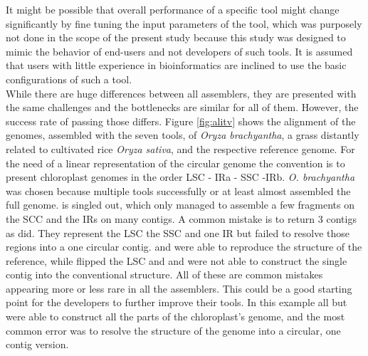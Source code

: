 It might be possible that overall performance of a specific tool might change
significantly by fine tuning the input parameters of the tool, which was purposely not
done in the scope of the present study because this study was designed to mimic the
behavior of end-users and not developers of such tools. It is assumed that
users with little experience in bioinformatics are inclined to use the basic configurations of such a tool. \\

While there are huge differences between all assemblers, they are presented with the same
challenges and the bottlenecks are similar for all of them. However, the success rate of
passing those differs. Figure \ref{fig:alitv} shows the alignment of the genomes,
assembled with the seven tools, of \textit{Oryza brachyantha}, a grass distantly related to
cultivated rice \textit{Oryza sativa}, and the respective reference genome. For the need
of a linear representation of the circular genome the convention is to present chloroplast
genomes in the order LSC - IRa - SSC -IRb. \textit{O. brachyantha} was chosen because
multiple tools successfully or at least almost assembled the full genome.  \cassp
\hspace{.5ex} is singled out, which only managed to assemble a few fragments on the SCC
and the IRs on many contigs. A common mistake is to return 3 contigs as \ioga
\hspace{.5ex} did. They represent the LSC the SSC and one IR but failed to resolve those
regions into a one circular contig. \go \hspace{.5ex} and \fp \hspace{.5ex} were able to
reproduce the structure of the reference, while \ce \hspace{.5ex} flipped the LSC and \np
\hspace{.5ex} and \oa \hspace{.5ex} were not able to construct the single contig into the
conventional structure. All of these are common mistakes appearing more or less rare in
all the assemblers. This could be a good starting point for the developers to further
improve their tools. In this example all but \cassp \hspace{.5ex} were able to construct
all the parts of the chloroplast's genome, and the most common error was to resolve the
structure of the genome into a circular, one contig version.

